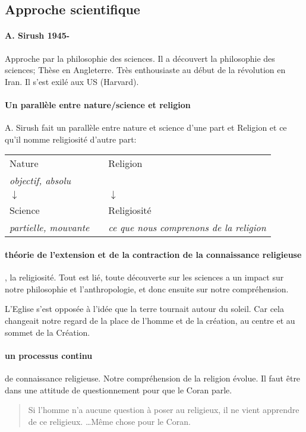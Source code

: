 \subsection{Approche scientifique }

\paragraph{A. Sirush 1945-} Approche par la philosophie des sciences. Il a découvert la philosophie des sciences; Thèse en Angleterre. Très enthousiaste au début de la révolution en Iran. Il s'est exilé aux US (Harvard).

\paragraph{Un parallèle entre nature/science et religion} A. Sirush fait un parallèle entre nature et science d'une part et Religion et ce qu'il nomme religiosité d'autre part:
 
\begin{tabular}{p{5cm}p{1cm}p{5cm}}
Nature &  & Religion   \\
\textit{{objectif, absolu} }      \\                        
          $ \downarrow $  &  &         $ \downarrow $  \\
Science &  & Religiosité\\
\textit{{partielle, mouvante}}  & & \textit{ce que nous comprenons de la religion} \\
\end{tabular}
 


\paragraph{théorie de l'extension et de la contraction de la connaissance religieuse}, la religiosité. Tout est lié, toute découverte sur les sciences a un impact sur notre philosophie et l'anthropologie, et donc ensuite sur notre compréhension.


\begin{Ex}
L'Eglise s'est opposée à l'idée que la terre tournait autour du soleil. Car cela changeait notre regard de la place de l'homme et de la création, au centre et au sommet de la Création.
\end{Ex}

\paragraph{un processus continu} de connaissance religieuse. Notre compréhension de la religion évolue. Il faut être dans une attitude de questionnement pour que le Coran parle. 
\begin{quote}
    Si l'homme n'a aucune question à poser au religieux, il ne vient apprendre de ce religieux. \ldots Même chose pour le Coran.
\end{quote}

